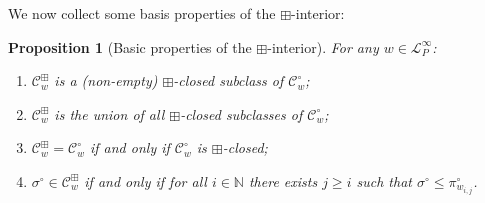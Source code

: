 \documentclass[11pt,a4paper]{article}
\newtheorem{prop}[thm]{Proposition}
\theoremstyle{definition}
\begin{document}
We now collect some basis properties of the $\boxplus$-interior:

\begin{prop}[Basic properties of the $\boxplus$-interior] \label{prop:boxprops}
For any $w \in \mathcal{L}^{\infty}_{P}$:
\begin{enumerate}
\item $\mathcal{C}^{\boxplus}_{w}$ is a (non-empty) $\boxplus$-closed subclass of $\mathcal{C}^{\circ}_{w}$; \label{boxprops:1}
\item $\mathcal{C}^{\boxplus}_{w}$ is the union of all $\boxplus$-closed subclasses of $\mathcal{C}^{\circ}_{w}$; \label{boxprops:2}
\item $\mathcal{C}^{\boxplus}_{w} = \mathcal{C}^{\circ}_{w}$ if and only if $\mathcal{C}^{\circ}_{w}$ is $\boxplus$-closed; \label{boxprops:3}
\item $\sigma^{\circ} \in \mathcal{C}^{\boxplus}_{w}$ if and only if for all $i \in \mathbb{N}$ there exists $j \geq i$ such that $\sigma^{\circ} \leq \pi^{\circ}_{w_{i,j}}$. \label{boxprops:4}
\end{enumerate}
\end{prop}
\end{document}
